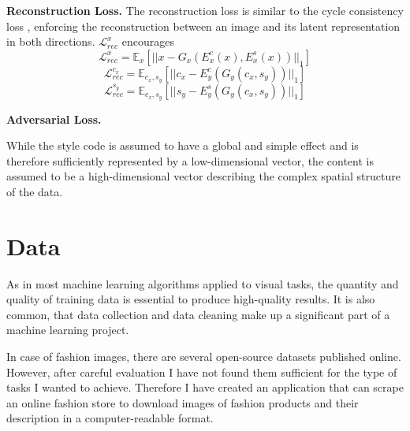 \documentclass{article}
\begin{document}
\textbf{Reconstruction Loss.}
The reconstruction loss is similar to the cycle consistency loss \cite{zhu_unpaired_2017}, enforcing the reconstruction between an image and its latent representation in both directions. $\mathcal{L}^{x}_{rec}$ encourages 
\begin{equation}
\mathcal{L}^{x}_{rec} = \mathbb{E}_{x}[||x - G_{x}(E^{c}_{x}(x), E^{s}_{x}(x))||_{1}]
\end{equation}
\begin{equation}
\mathcal{L}^{c_{x}}_{rec} = \mathbb{E}_{c_{x}, s_{y}}[||c_{x} - E^{c}_{y}(G_{y}(c_{x},s_{y}))||_{1}]
\end{equation}
\begin{equation}
\mathcal{L}^{s_{y}}_{rec} = \mathbb{E}_{c_{x}, s_{y}}[||s_{y} - E^{s}_{y}(G_{y}(c_{x},s_{y}))||_{1}]
\end{equation}


\textbf{Adversarial Loss.}



While the style code is assumed to have a global and simple effect and is therefore sufficiently represented by a low-dimensional vector, the content is assumed to be a high-dimensional vector describing the complex spatial structure of the data.





\section{Data}
As in most machine learning algorithms applied to visual tasks, the quantity and quality of training data is essential to produce high-quality results. It is also common, that data collection and data cleaning make up a significant part of a machine learning project.

In case of fashion images, there are several open-source datasets published online. However, after careful evaluation I have not found them sufficient for the type of tasks I wanted to achieve. Therefore I have created an application that can scrape an online fashion store to download images of fashion products and their description in a computer-readable format.

\end{document}
